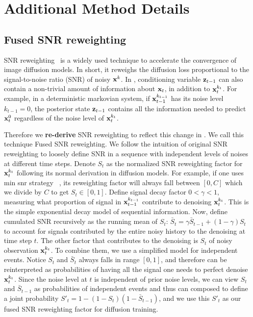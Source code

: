 \section{Additional Method Details}

\subsection{Fused SNR reweighting}
\label{app:snr_derivation}
SNR reweighting~\cite{min_snr} is a widely used technique to accelerate the convergence of image diffusion models. In short, it reweighs the diffusion loss proportional to the signal-to-noise ratio (SNR) of noisy $\mathbf{x}^k$. In \algo, conditioning variable $\mathbf{z}_{t-1}$ can also contain a non-trivial amount of information about $\mathbf{x}_t$, in addition to $\mathbf{x}_t^{k_t}$. For example, in a deterministic markovian system, if $\mathbf{x}_{t-1}^{k_{t-1}}$ has its noise level $k_{t-1}=0$, the posterior state $\mathbf{z}_{t-1}$ contains all the information needed to predict $\mathbf{x}^0_t$ regardless of the noise level of $\mathbf{x}_t^{k_t}$.

Therefore we \textbf{re-derive} SNR reweighting to reflect this change in \algo. We call this technique Fused SNR reweighting. We follow the intuition of original SNR reweighting to loosely define SNR in a sequence with independent levels of noises at different time steps. Denote $S_t$ as the normalized SNR reweighting factor for $\mathbf{x}_t^{k_t}$ following its normal derivation in diffusion models. For example, if one uses min snr strategy ~\cite{min_snr}, its reweighting factor will always fall between $[0, C]$ which we divide by $C$ to get $S_t\in [0, 1]$. Define signal decay factor $0<\gamma<1$, measuring what proportion of signal in $\mathbf{x}_{t-1}^{k_{t-1}}$ contribute to denoising $\mathbf{x}_t^{k_t}$. This is the simple exponential decay model of sequential information. Now, define cumulated SNR recursively as the running mean of $S_t$: $\bar{S}_t=\gamma \bar{S}_{t-1} + (1 -\gamma)S_{t}$ to account for signals contributed by the entire noisy history to the denoising at time step $t$. The other factor that contributes to the denoising is $S_t$ of noisy observation $\mathbf{x}_t^{k_t}$. To combine them, we use a simplified model for independent events. Notice $S_t$ and $\bar{S}_t$ always falls in range $[0, 1]$, and therefore can be reinterpreted as probabilities of having all the signal one needs to perfect denoise $\mathbf{x}_t^{k_t}$. Since the noise level at $t$ is independent of prior noise levels, we can view $S_t$ and $\bar{S}_{t-1}$ as probabilities of independent events and thus can composed to define a joint probability $S'_t=1-(1-S_t)(1-\bar{S}_{t-1})$, and we use this $S'_t$ as our fused SNR reweighting factor for diffusion training. 

